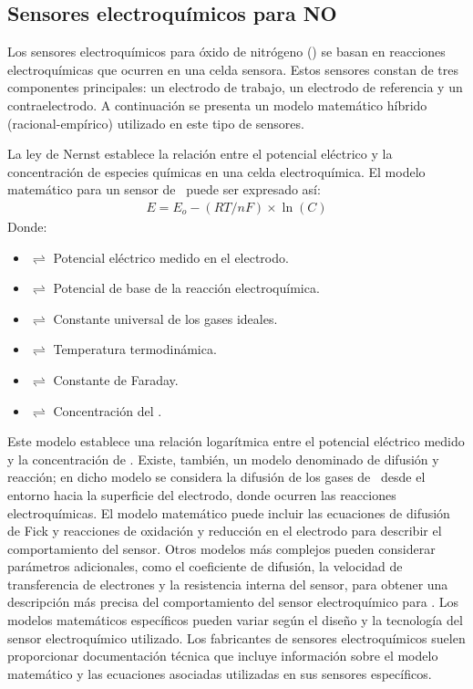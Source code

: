 \subsection{Sensores electroquímicos para \texorpdfstring{NO}{NOx}}

Los sensores electroquímicos para óxido de nitrógeno (\NOX) se basan en reacciones electroquímicas que ocurren en una celda sensora. Estos sensores constan de tres componentes principales: un electrodo de trabajo, un electrodo de referencia y un contraelectrodo. A continuación se presenta un modelo matemático híbrido (racional-empírico) utilizado en este tipo de sensores.

La ley de Nernst establece la relación entre el potencial eléctrico y la concentración de especies químicas en una celda electroquímica. El modelo matemático para un sensor de \NOX\ puede ser expresado así:
\begin{gather}
  \label{nox}
  E=E_o-(RT/nF)\times \ln(C)
\end{gather}
Donde:

\begin{itemize}
  \item[$E$] $\rightleftharpoons$  Potencial eléctrico medido en el electrodo.
  \item[$E_o$] $\rightleftharpoons$  Potencial de base de la reacción electroquímica.
  \item[$R$] $\rightleftharpoons$  Constante universal de los gases ideales.
  \item[$T$] $\rightleftharpoons$  Temperatura termodinámica.
  \item[$F$] $\rightleftharpoons$  Constante de Faraday.
  \item[$C$] $\rightleftharpoons$  Concentración del \NOX.
\end{itemize}

Este modelo establece una relación logarítmica entre el potencial eléctrico medido y la concentración de \NOX.
Existe, también, un modelo denominado de difusión y reacción; en dicho modelo se considera la difusión de los gases de \NOX\ desde el entorno hacia la superficie del electrodo, donde ocurren las reacciones electroquímicas. El modelo matemático puede incluir las ecuaciones de difusión de Fick y reacciones de oxidación y reducción en el electrodo para describir el comportamiento del sensor.
Otros modelos más complejos pueden considerar parámetros adicionales, como el coeficiente de difusión, la velocidad de transferencia de electrones y la resistencia interna del sensor, para obtener una descripción más precisa del comportamiento del sensor electroquímico para \NOX.
Los modelos matemáticos específicos pueden variar según el diseño y la tecnología del sensor electroquímico utilizado. Los fabricantes de sensores electroquímicos suelen proporcionar documentación técnica que incluye información sobre el modelo matemático y las ecuaciones asociadas utilizadas en sus sensores específicos.


